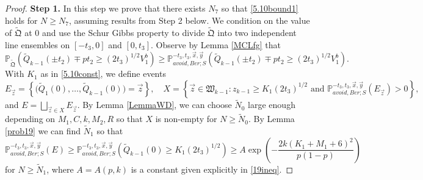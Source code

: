 \begin{proof}
	\noindent\textbf{Step 1.} In this step we prove that there exists $N_7$ so that \eqref{5.10bound1} holds for $N\geq N_7$, assuming results from Step 2 below. We condition on the value of $\tilde{\mathfrak{Q}}$ at 0 and use the Schur Gibbs property to divide $\tilde{\mathfrak{Q}}$ into two independent line ensembles on $[-t_3,0]$ and $[0,t_3]$. Observe by Lemma \ref{MCLfg} that
	\begin{equation}\label{5.10MC}
	\mathbb{P}_{\tilde{\mathfrak{Q}}}\left(\tilde{Q}_{k-1}(\pm t_2) \mp pt_2 \geq (2t_3)^{1/2}V_1^b\right) \geq \mathbb{P}^{-t_3,t_3,\vec{x},\vec{y}}_{avoid, Ber; S}\left(\tilde{Q}_{k-1}(\pm t_2) \mp pt_2 \geq (2t_3)^{1/2}V_1^b\right).
	\end{equation}
	With $K_1$ as in \eqref{5.10const}, we define events
	\[
	E_{\vec{z}} = \left\{\big(\tilde{Q}_1(0),\dots,\tilde{Q}_{k-1}(0)\big) = \vec{z}\right\}, \quad X = \left\{ \vec{z}\in\mathfrak{W}_{k-1} : z_{k-1} \geq K_1(2t_3)^{1/2} \mbox { and } \mathbb{P}^{-t_3,t_3,\vec{x},\vec{y}}_{avoid,Ber; S}(E_{\vec{z}}) > 0\right\},
	\]
	and $E = \bigsqcup_{\vec{z} \in X} E_{\vec{z}}$. By Lemma \ref{LemmaWD}, we can choose $\tilde{N}_0$ large enough depending on $M_1,C,k,M_2,R$ so that $X$ is non-empty for $N\geq\tilde{N}_0$. By Lemma \ref{prob19} we can find $\tilde{N}_1$ so that
	\begin{equation}\label{5.10Ebound}
	\mathbb{P}^{-t_3,t_3,\vec{x},\vec{y}}_{avoid, Ber; S}(E) \geq \mathbb{P}^{-t_3,t_3,\vec{x},\vec{y}}_{avoid,Ber; S}\left(\tilde{Q}_{k-1}(0) \geq K_1(2t_3)^{1/2}\right) \geq A\exp\left(-\frac{2k(K_1+M_1+6)^2}{p(1-p)}\right)
	\end{equation}
	for $N\geq\tilde{N}_1$, where $A = A(p,k)$ is a constant given explicitly in \eqref{19ineq}.
	

\end{proof}
